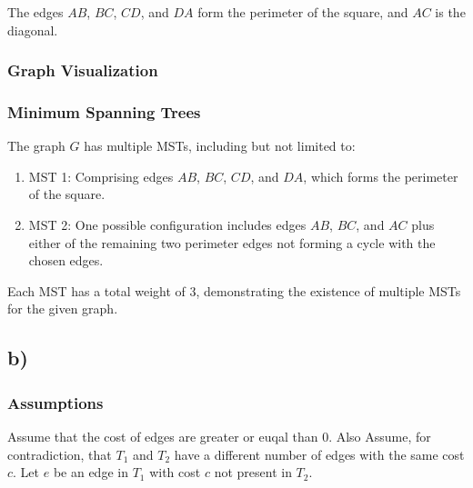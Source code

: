 \documentclass{article}
\begin{document}
The edges \(AB\), \(BC\), \(CD\), and \(DA\) form the perimeter of the square, and \(AC\) is the diagonal.

\subsubsection{Graph Visualization}
\begin{center}

\end{center}

\subsubsection{Minimum Spanning Trees}

The graph \(G\) has multiple MSTs, including but not limited to:

\begin{enumerate}
    \item MST 1: Comprising edges \(AB\), \(BC\), \(CD\), and \(DA\), which forms the perimeter of the square.
    \item MST 2: One possible configuration includes edges \(AB\), \(BC\), and \(AC\) plus either of the remaining two perimeter edges not forming a cycle with the chosen edges.
\end{enumerate}

Each MST has a total weight of 3, demonstrating the existence of multiple MSTs for the given graph.

\subsection{b)}
\subsubsection{Assumptions}
Assume that the cost of edges are greater or euqal than 0. Also Assume, for contradiction, that \(T_1\) and \(T_2\) have a different number of edges with the same cost \(c\). Let \(e\) be an edge in \(T_1\) with cost \(c\) not present in \(T_2\).
\end{document}
